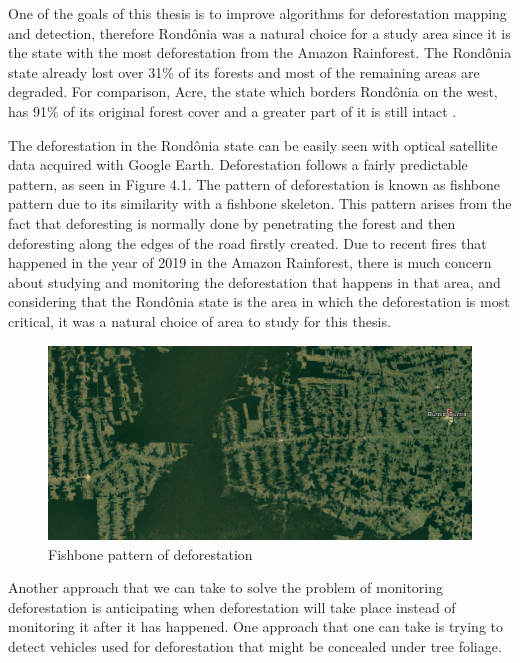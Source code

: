 One of the goals of this thesis is to improve algorithms for deforestation mapping and detection, therefore Rondônia was a natural choice for a study area since it is the state with the most deforestation from the Amazon Rainforest. The Rondônia
state already lost over 31\% of its forests and most of the remaining areas are degraded.
For comparison, Acre, the state which borders Rondônia on the west, has 91\% of its
original forest cover and a greater part of it is still intact \cite{rondoniaDeforestation}. 

The deforestation in the Rondônia state can be easily seen with optical satellite data
acquired with Google Earth. Deforestation follows a fairly predictable pattern, as seen in
Figure 4.1. The pattern of deforestation is known as fishbone pattern due to its similarity
with a fishbone skeleton. This pattern arises from the fact that deforesting is normally done
by penetrating the forest and then deforesting along the edges of the road firstly created. Due to recent fires that happened in the year of 2019 in the Amazon Rainforest, there
is much concern about studying and monitoring the deforestation that happens in that
area, and considering that the Rondônia state is the area in which the deforestation is
most critical, it was a natural choice of area to study for this thesis.

\begin{figure}[H]
    \centering
    \includegraphics[width=\linewidth]{Cap2-Methods/fishbone.png}
    \caption{Fishbone pattern of deforestation}
    \label{fig:fishbone}
\end{figure}


Another approach that we can take to solve the problem of monitoring deforestation is anticipating when deforestation will take place instead of monitoring it after it has happened. One approach that one can take is trying to detect vehicles used for deforestation that might be concealed under tree foliage. 

